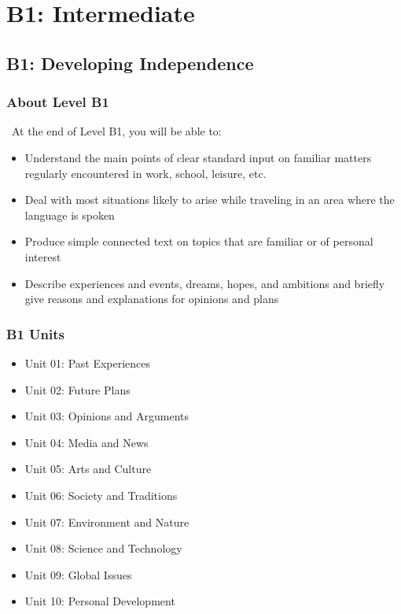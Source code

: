 
\part{B1: Intermediate}
\label{part:b1}

\chapter{B1: Developing Independence}
\label{chap:b1}

\section*{About Level B1}

\levelBone\ At the end of Level B1, you will be able to:

\begin{itemize}
\item Understand the main points of clear standard input on familiar matters regularly encountered in work, school, leisure, etc.
\item Deal with most situations likely to arise while traveling in an area where the language is spoken
\item Produce simple connected text on topics that are familiar or of personal interest
\item Describe experiences and events, dreams, hopes, and ambitions and briefly give reasons and explanations for opinions and plans
\end{itemize}

\section*{B1 Units}
\begin{itemize}
\item Unit 01: Past Experiences
\item Unit 02: Future Plans
\item Unit 03: Opinions and Arguments
\item Unit 04: Media and News
\item Unit 05: Arts and Culture
\item Unit 06: Society and Traditions
\item Unit 07: Environment and Nature
\item Unit 08: Science and Technology
\item Unit 09: Global Issues
\item Unit 10: Personal Development
\end{itemize}

